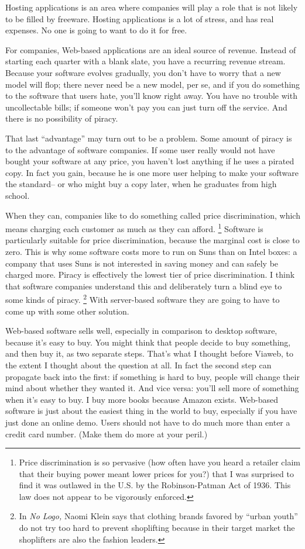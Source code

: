 \documentclass[12pt]{book}
\begin{document}
Hosting applications is an area where companies will play a role that is
not likely to be filled by freeware. Hosting applications is a lot of
stress, and has real expenses. No one is going to want to do it for
free.

For companies, Web-based applications are an ideal source of revenue.
Instead of starting each quarter with a blank slate, you have a
recurring revenue stream. Because your software evolves gradually, you
don't have to worry that a new model will flop; there never need be a
new model, per se, and if you do something to the software that users
hate, you'll know right away. You have no trouble with uncollectable
bills; if someone won't pay you can just turn off the service. And there
is no possibility of piracy.

That last ``advantage'' may turn out to be a problem. Some amount of
piracy is to the advantage of software companies. If some user really
would not have bought your software at any price, you haven't lost
anything if he uses a pirated copy. In fact you gain, because he is one
more user helping to make your software the standard-- or who might buy
a copy later, when he graduates from high school.

When they can, companies like to do something called price
discrimination, which means charging each customer as much as they can
afford. \footnote{Price discrimination is so pervasive (how often have you heard a
retailer claim that their buying power meant lower prices for you?) that
I was surprised to find it was outlawed in the U.S. by the
Robinson-Patman Act of 1936. This law does not appear to be vigorously
enforced.} Software is particularly suitable for price
discrimination, because the marginal cost is close to zero. This is why
some software costs more to run on Suns than on Intel boxes: a company
that uses Suns is not interested in saving money and can safely be
charged more. Piracy is effectively the lowest tier of price
discrimination. I think that software companies understand this and
deliberately turn a blind eye to some kinds of piracy. \footnote{In \emph{No Logo,} Naomi Klein says that clothing brands favored
by ``urban youth'' do not try too hard to prevent shoplifting because in
their target market the shoplifters are also the fashion leaders.} With
server-based software they are going to have to come up with some other
solution.

Web-based software sells well, especially in comparison to desktop
software, because it's easy to buy. You might think that people decide
to buy something, and then buy it, as two separate steps. That's what I
thought before Viaweb, to the extent I thought about the question at
all. In fact the second step can propagate back into the first: if
something is hard to buy, people will change their mind about whether
they wanted it. And vice versa: you'll sell more of something when it's
easy to buy. I buy more books because Amazon exists. Web-based software
is just about the easiest thing in the world to buy, especially if you
have just done an online demo. Users should not have to do much more
than enter a credit card number. (Make them do more at your peril.)
\end{document}
